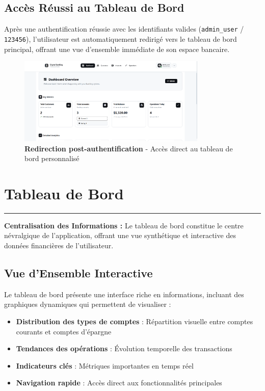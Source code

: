 \documentclass[11pt, a4paper]{article}
\newcommand{\accentline}{\textcolor{accent}{\rule{\textwidth}{1pt}}}
\begin{document}
\subsection{Accès Réussi au Tableau de Bord}

Après une authentification réussie avec les identifiants valides (\texttt{admin\_user} / \texttt{123456}), l'utilisateur est automatiquement redirigé vers le tableau de bord principal, offrant une vue d'ensemble immédiate de son espace bancaire.

\begin{figure}[H]
    \centering
    \includegraphics[width=0.8\textwidth]{screenshots/01_03_login_successful_dashboard.png}
    \caption{\textbf{Redirection post-authentification} - Accès direct au tableau de bord personnalisé}
    \label{fig:login_successful}
\end{figure}

\section{Tableau de Bord}
\accentline

\textbf{Centralisation des Informations :} Le tableau de bord constitue le centre névralgique de l'application, offrant une vue synthétique et interactive des données financières de l'utilisateur.

\subsection{Vue d'Ensemble Interactive}

Le tableau de bord présente une interface riche en informations, incluant des graphiques dynamiques qui permettent de visualiser :

\begin{itemize}[leftmargin=20pt, itemsep=3pt]
    \item \textbf{Distribution des types de comptes} : Répartition visuelle entre comptes courants et comptes d'épargne
    \item \textbf{Tendances des opérations} : Évolution temporelle des transactions
    \item \textbf{Indicateurs clés} : Métriques importantes en temps réel
    \item \textbf{Navigation rapide} : Accès direct aux fonctionnalités principales
\end{itemize}
\end{document}
